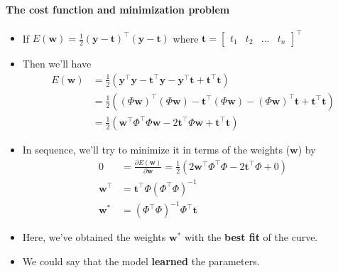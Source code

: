 \begin{frame}{\insertsubsection}
	\framesubtitle{The cost function and minimization problem}
	\begin{itemize}
		\item If $E(\mathbf{w}) = \frac{1}{2} \left( \mathbf{y} - \mathbf{t} \right)^{\top}\left( \mathbf{y} - \mathbf{t} \right)$ where $\mathbf{t} = \begin{bmatrix} t_1 & t_2 & ... & t_n
		\end{bmatrix}^{\top}$
		\item Then we'll have 
		\begin{align*}
			E(\mathbf{w}) &= \frac{1}{2} \left( \mathbf{y}^{\top}\mathbf{y} -  \mathbf{t}^{\top}\mathbf{y} - \mathbf{y}^{\top}\mathbf{t} + \mathbf{t}^{\top}\mathbf{t} \right) \\
					   &= \frac{1}{2} \left( ( \Phi \mathbf{w})^{\top}( \Phi \mathbf{w}) -  \mathbf{t}^{\top}( \Phi \mathbf{w}) - ( \Phi \mathbf{w})^{\top}\mathbf{t} + \mathbf{t}^{\top}\mathbf{t} \right) \\
					   &= \frac{1}{2} \left( \mathbf{w}^{\top} \Phi^{\top} \Phi \mathbf{w} -  2\mathbf{t}^{\top} \Phi \mathbf{w} + \mathbf{t}^{\top}\mathbf{t} \right)
		\end{align*}
		\item In sequence, we'll try to minimize it in terms of the weights ($\mathbf{w}$) by
			\begin{align*}
				0 &= \frac{\partial E(\mathbf{w})}{\partial \mathbf{w}} = \frac{1}{2} \left( 2 \mathbf{w}^{\top} \Phi^{\top} \Phi  -  2\mathbf{t}^{\top} \Phi + 0 \right) \\
				\mathbf{w}^{\top} &=  \mathbf{t}^{\top} \Phi \left( \Phi^{\top} \Phi \right)^{-1} \\
				\mathbf{w}^* &= \left( \Phi^{\top} \Phi \right)^{-1}\Phi^{\top} \mathbf{t}
			\end{align*}
		\item Here, we've obtained the weights $\mathbf{w}^*$ with the \textcolor{UniOrange}{\textbf{best fit}} of the curve.
		\item We could say that the model \textcolor{UniOrange}{\textbf{learned}} the parameters.
	\end{itemize}
\end{frame}

\begin{frame}

\end{frame}

